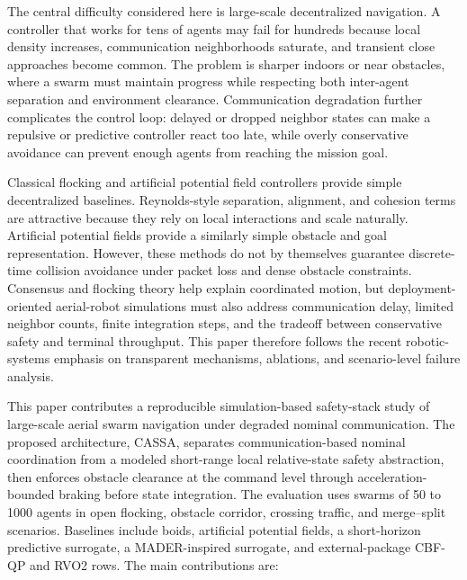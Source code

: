 \documentclass[11pt]{article}
\begin{document}
The central difficulty considered here is large-scale decentralized navigation. A controller that works for tens of agents may fail for hundreds because local density increases, communication neighborhoods saturate, and transient close approaches become common. The problem is sharper indoors or near obstacles, where a swarm must maintain progress while respecting both inter-agent separation and environment clearance. Communication degradation further complicates the control loop: delayed or dropped neighbor states can make a repulsive or predictive controller react too late, while overly conservative avoidance can prevent enough agents from reaching the mission goal.

Classical flocking and artificial potential field controllers provide simple decentralized baselines. Reynolds-style separation, alignment, and cohesion terms \cite{reynolds1987flocks} are attractive because they rely on local interactions and scale naturally. Artificial potential fields \cite{khatib1986realtime} provide a similarly simple obstacle and goal representation. However, these methods do not by themselves guarantee discrete-time collision avoidance under packet loss and dense obstacle constraints. Consensus and flocking theory \cite{olfati2006flocking} help explain coordinated motion, but deployment-oriented aerial-robot simulations must also address communication delay, limited neighbor counts, finite integration steps, and the tradeoff between conservative safety and terminal throughput. This paper therefore follows the recent robotic-systems emphasis on transparent mechanisms, ablations, and scenario-level failure analysis.

This paper contributes a reproducible simulation-based safety-stack study of large-scale aerial swarm navigation under degraded nominal communication. The proposed architecture, CASSA, separates communication-based nominal coordination from a modeled short-range local relative-state safety abstraction, then enforces obstacle clearance at the command level through acceleration-bounded braking before state integration. The evaluation uses swarms of 50 to 1000 agents in open flocking, obstacle corridor, crossing traffic, and merge--split scenarios. Baselines include boids, artificial potential fields, a short-horizon predictive surrogate, a MADER-inspired surrogate, and external-package CBF-QP and RVO2 rows. The main contributions are:
\end{document}
